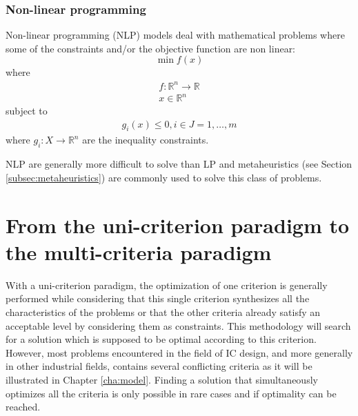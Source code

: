 \subsubsection{Non-linear programming}
Non-linear programming (NLP) models deal with mathematical problems where some of the constraints and/or the objective function are non linear:
\begin{equation}
\min f(x)
\end{equation}
where
\begin{equation*}
\begin{gathered}
f: \mathbb{R}^n \rightarrow \mathbb{R}\\
x \in \mathbb{R}^n
\end{gathered}
\end{equation*}
subject to
\begin{equation*}
\begin{gathered}
g_i(x) \leq 0, i \in J = 1, \dots, m
\end{gathered}
\end{equation*}
where $g_i : X \rightarrow \mathbb{R}^n$ are the inequality constraints.

NLP are generally more difficult to solve than LP \cite{talbi09} and metaheuristics (see Section \ref{subsec:metaheuristics}) are commonly used to solve this class of problems.




\section{From the uni-criterion paradigm to the multi-criteria paradigm}
\label{sec:rol2.unicritmulticrit}

With a uni-criterion paradigm, the optimization of one criterion is generally performed while considering that this single criterion synthesizes all the characteristics of the problems or that the other criteria already satisfy an acceptable level by considering them as constraints. This methodology will search for a solution which is supposed to be optimal according to this criterion. However, most problems encountered in the field of IC design, and more generally in other industrial fields, contains several conflicting criteria as it will be illustrated in Chapter \ref{cha:model}. Finding a solution that simultaneously optimizes all the criteria is only possible in rare cases and if optimality can be reached.

